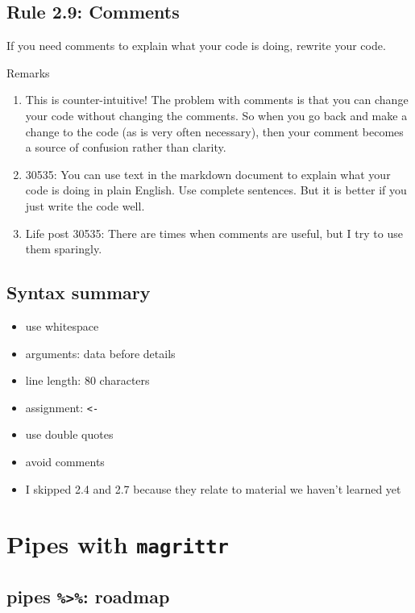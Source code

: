 \documentclass[
  letterpaper,
  DIV=11,
  numbers=noendperiod]{scrreprt}
\providecommand{\tightlist}{%
  \setlength{\itemsep}{0pt}\setlength{\parskip}{0pt}}\usepackage{longtable,booktabs,array}
\begin{document}
\subsection{Rule 2.9: Comments}\label{rule-2.9-comments}

If you need comments to explain what your code is doing, rewrite your
code.

Remarks

\begin{enumerate}
\def\labelenumi{\arabic{enumi}.}
\item
  This is counter-intuitive! The problem with comments is that you can
  change your code without changing the comments. So when you go back
  and make a change to the code (as is very often necessary), then your
  comment becomes a source of confusion rather than clarity.
\item
  30535: You can use text in the markdown document to explain what your
  code is doing in plain English. Use complete sentences. But it is
  better if you just write the code well.
\item
  Life post 30535: There are times when comments are useful, but I try
  to use them sparingly.
\end{enumerate}

\subsection{Syntax summary}\label{syntax-summary}

\begin{itemize}
\tightlist
\item
  use whitespace
\item
  arguments: data before details
\item
  line length: 80 characters
\item
  assignment: \texttt{\textless{}-}
\item
  use double quotes
\item
  avoid comments
\item
  I skipped 2.4 and 2.7 because they relate to material we haven't
  learned yet
\end{itemize}

\section{\texorpdfstring{Pipes with
\texttt{magrittr}}{Pipes with magrittr}}\label{pipes-with-magrittr}

\subsection{\texorpdfstring{pipes \texttt{\%\textgreater{}\%}:
roadmap}{pipes \%\textgreater\%: roadmap}}\label{pipes-roadmap}
\end{document}
